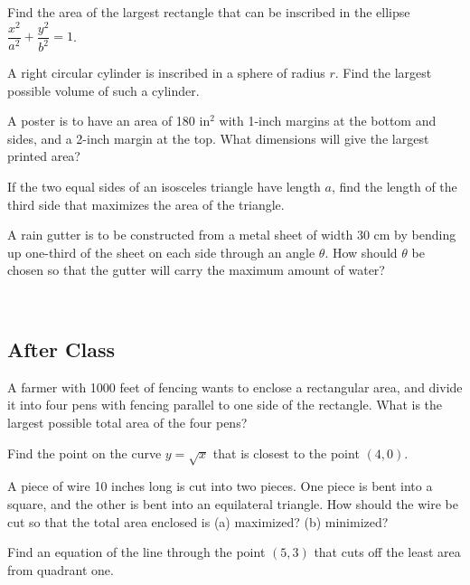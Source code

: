 \documentclass[notes]{subfiles}
\begin{document}
		\begin{ex}
			Find the area of the largest rectangle that can be inscribed in the ellipse $\dfrac{x^2}{a^2}+\dfrac{y^2}{b^2} = 1$.
		\end{ex}
			
		\begin{ex}
			A right circular cylinder is inscribed in a sphere of radius $r$.  Find the largest possible volume of such a cylinder.
		\end{ex}
			\newpage
			
		\begin{ex}
			A poster is to have an area of 180 in$^2$ with 1-inch margins at the bottom and sides, and a 2-inch margin at the top.  What dimensions will give the largest printed area?
		\end{ex}
			
		\begin{ex}
			If the two equal sides of an isosceles triangle have length $a$, find the length of the third side that maximizes the area of the triangle.
		\end{ex}
			\newpage
			
		\begin{ex}
			A rain gutter is to be constructed from a metal sheet of width 30 cm by bending up one-third of the sheet on each side through an angle $\theta$.  How should $\theta$ be chosen so that the gutter will carry the maximum amount of water?
		\end{ex}
			 \\
			\newsec $ $
			
	\subsection*{After Class}
		\begin{ex}
			A farmer with 1000 feet of fencing wants to enclose a rectangular area, and divide it into four pens with fencing parallel to one side of the rectangle.  What is the largest possible total area of the four pens?
		\end{ex}
			\newpage
			
		\begin{ex}
			Find the point on the curve $y = \sqrt{x}$ that is closest to the point $(4,0)$.
		\end{ex}
			
		\begin{ex}
			A piece of wire 10 inches long is cut into two pieces.  One piece is bent into a square, and the other is bent into an equilateral triangle.  How should the wire be cut so that the total area enclosed is (a) maximized? (b) minimized?
		\end{ex}
			\newpage
			
		\begin{ex}
			Find an equation of the line through the point $(5,3)$ that cuts off the least area from quadrant one.
		\end{ex}	
	\clearpage
\end{document}
